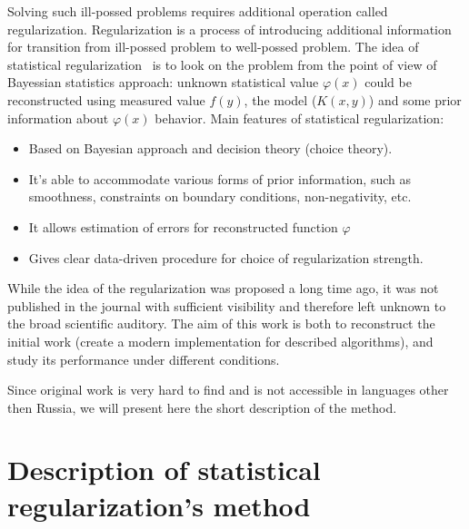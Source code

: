 \documentclass{webofc}
\begin{document}
Solving such ill-possed problems requires additional operation called regularization. Regularization is a process of introducing additional information for transition from ill-possed problem to well-possed problem. The idea of statistical regularization~\cite{Turchin, Turovceva} is to look on the problem from the point of view of Bayessian statistics approach: unknown statistical value $\varphi(x)$ could be reconstructed using  measured value $f(y)$, the model ($K(x,y)$) and some prior information about $\varphi(x)$ behavior. Main features of statistical regularization:
\begin{itemize}
    \item Based on Bayesian approach and decision theory (choice theory).
    \item It's able to accommodate various forms of prior information, such as
      smoothness, constraints on boundary conditions, non-negativity, etc.
    \item It allows estimation of errors for reconstructed function $\varphi$
    \item Gives clear data-driven procedure for choice of regularization
      strength.
\end{itemize}

While the idea of the regularization was proposed a long time ago, it was not published in the journal with sufficient visibility and therefore left unknown to the broad scientific auditory. The aim of this work is both to reconstruct the initial work (create a modern implementation for described algorithms), and study its performance under different conditions.

Since original work is very hard to find and is not accessible in languages other then Russia, we will present here the short description of the method.

\section{Description of statistical regularization's method}
\end{document}
